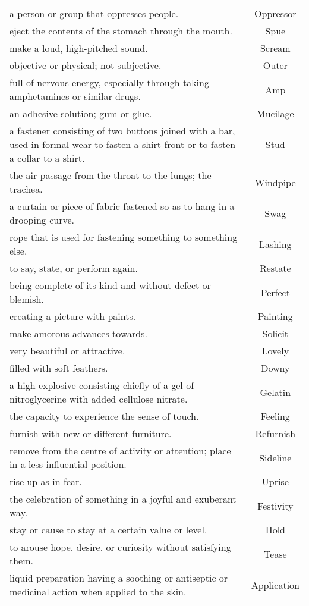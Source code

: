 \begin{longtable}{p{12cm}c}
a person or group that oppresses people. & Oppressor\\
eject the contents of the stomach through the mouth. & Spue\\
make a loud, high-pitched sound. & Scream\\
objective or physical; not subjective. & Outer\\
full of nervous energy, especially through taking amphetamines or similar drugs. & Amp\\
an adhesive solution; gum or glue. & Mucilage\\
a fastener consisting of two buttons joined with a bar, used in formal wear to fasten a shirt front or to fasten a collar to a shirt. & Stud\\
the air passage from the throat to the lungs; the trachea. & Windpipe\\
a curtain or piece of fabric fastened so as to hang in a drooping curve. & Swag\\
rope that is used for fastening something to something else. & Lashing\\
to say, state, or perform again. & Restate\\
being complete of its kind and without defect or blemish. & Perfect\\
creating a picture with paints. & Painting\\
make amorous advances towards. & Solicit\\
very beautiful or attractive. & Lovely\\
filled with soft feathers. & Downy\\
a high explosive consisting chiefly of a gel of nitroglycerine with added cellulose nitrate. & Gelatin\\
the capacity to experience the sense of touch. & Feeling\\
furnish with new or different furniture. & Refurnish\\
remove from the centre of activity or attention; place in a less influential position. & Sideline\\
rise up as in fear. & Uprise\\
the celebration of something in a joyful and exuberant way. & Festivity\\
stay or cause to stay at a certain value or level. & Hold\\
to arouse hope, desire, or curiosity without satisfying them. & Tease\\
liquid preparation having a soothing or antiseptic or medicinal action when applied to the skin. & Application\\

\end{longtable}

